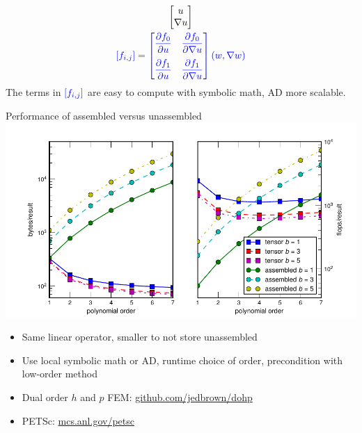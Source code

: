 \documentclass{beamer}
\begin{document}
\begin{frame}
\begin{gather*}
      \begin{bmatrix} u \\ \nabla u \end{bmatrix} \\
      {\color{blue} [f_{i,j}] = \begin{bmatrix} \dfrac{\partial f_0}{\partial u} & \dfrac{\partial f_0}{\partial \nabla u} \\[1em]
        \dfrac{\partial f_1}{\partial u} & \dfrac{\partial f_1}{\partial \nabla u} \end{bmatrix} (w,\nabla w) }
    \end{gather*}
    The terms in ${\color{blue} [f_{i,j}]}$ are easy to compute with symbolic math, AD more scalable.
\end{frame}

\begin{frame}{Performance of assembled versus unassembled}
  \includegraphics[width=\textwidth]{figures/TensorVsAssembly} \\
  \begin{itemize}
  \item Same linear operator, smaller to not store unassembled
  \item Use local symbolic math or AD, runtime choice of order, precondition with low-order method
  \item Dual order $h$ and $p$ FEM: \url{github.com/jedbrown/dohp}
  \item PETSc: \url{mcs.anl.gov/petsc}
  \end{itemize}
\end{frame}
\end{document}
